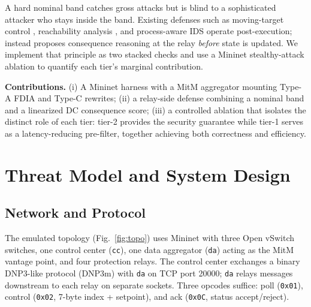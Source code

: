 \documentclass[conference]{IEEEtran}
\begin{document}
A hard nominal band catches gross attacks but is blind to a sophisticated attacker who stays inside the band. Existing defenses such as moving-target control \cite{kanellopoulosMovingTargetDefense2020}, reachability analysis \cite{zhangReachabilityAnalysisCyberPhysical2022}, and process-aware IDS \cite{menzelRealworldCaseStudies2025} operate post-execution; \cite{linSafetycriticalCyberphysicalAttacks2016} instead proposes consequence reasoning at the relay \emph{before} state is updated. We implement that principle as two stacked checks and use a Mininet stealthy-attack ablation to quantify each tier's marginal contribution.

\textbf{Contributions.} (i) A Mininet harness \cite{lantzMininet2010,zhuSCADATaxonomy2011} with a MitM aggregator mounting Type-A FDIA and Type-C rewrites; (ii) a relay-side defense combining a nominal band and a linearized DC consequence score; (iii) a controlled ablation that isolates the distinct role of each tier: tier-2 provides the security guarantee while tier-1 serves as a latency-reducing pre-filter, together achieving both correctness and efficiency.

\section{Threat Model and System Design}\label{sec:design}
\subsection{Network and Protocol}
The emulated topology (Fig.~\ref{fig:topo}) uses Mininet \cite{lantzMininet2010} with three Open vSwitch switches, one control center (\texttt{cc}), one data aggregator (\texttt{da}) acting as the MitM vantage point, and four protection relays. The control center exchanges a binary DNP3-like protocol (DNP3m) with \texttt{da} on TCP port 20000; \texttt{da} relays messages downstream to each relay on separate sockets. Three opcodes suffice: poll (\texttt{0x01}), control (\texttt{0x02}, 7-byte index + setpoint), and ack (\texttt{0x0C}, status accept/reject).
\end{document}
